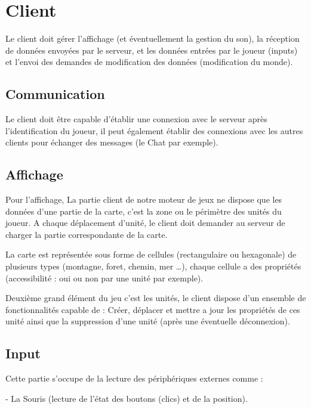 \documentclass[a4paper,10pt]{report}
\begin{document}
        
    \section{Client}

      Le client doit gérer l'affichage (et éventuellement la gestion du son), la réception de données envoyées par le serveur, et les données entrées par le joueur (inputs) et l'envoi des demandes de modification des données (modification du monde).

      \subsection{Communication}

        Le client doit être capable d’établir une connexion avec le serveur après l’identification du joueur, il peut également établir des connexions avec les autres clients pour échanger des messages (le Chat par exemple).

      \subsection{Affichage}

        Pour l’affichage, La partie client de notre moteur de jeux ne dispose que les données d’une partie de la carte, c’est la zone ou le périmètre des unités du joueur. A chaque déplacement d’unité, le client doit demander au serveur de charger la partie  correspondante de la carte.

        La carte est représentée sous forme de cellules (rectangulaire ou hexagonale) de plusieurs types (montagne, foret, chemin, mer …), chaque cellule a des propriétés (accessibilité : oui ou non par une unité par exemple).

        Deuxième grand élément du jeu c’est les unités, le client dispose d’un ensemble de fonctionnalités capable de : Créer, déplacer et mettre a jour les propriétés de ces unité ainsi que la suppression d’une unité (après une éventuelle déconnexion).

      \subsection{Input}

        Cette partie s'occupe de la lecture des périphériques externes comme :

        - La Souris (lecture de l'état des boutons (clics) et de la position).
\end{document}
